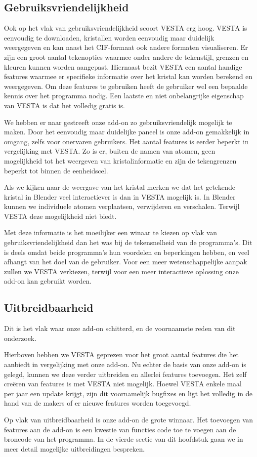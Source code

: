 \subsection{Gebruiksvriendelijkheid}	 
Ook op het vlak van gebruiksvriendelijkheid scoort VESTA erg hoog. VESTA is eenvoudig te downloaden, kristallen worden eenvoudig maar duidelijk weergegeven en kan naast het CIF-formaat ook andere formaten visualiseren. Er zijn een groot aantal tekenopties waarmee onder andere de tekenstijl, grenzen en kleuren kunnen worden aangepast. Hiernaast bezit VESTA een aantal handige features waarmee er specifieke informatie over het kristal kan worden berekend en weergegeven. Om deze features te gebruiken heeft de gebruiker wel een bepaalde kennis over het programma nodig. Een laatste en niet  onbelangrijke eigenschap van VESTA is dat het volledig gratis is.
\par
We hebben er naar gestreeft onze add-on zo gebruiksvriendelijk mogelijk te maken. Door het eenvoudig maar duidelijke paneel is onze add-on gemakkelijk in omgang, zelfs voor onervaren gebruikers. Het aantal features is eerder beperkt in vergelijking met VESTA. Zo is er, buiten de namen van atomen, geen mogelijkheid tot het weergeven van kristalinformatie en zijn de tekengrenzen beperkt tot binnen de eenheidscel. 
\par
Als we kijken naar de weergave van het kristal merken we dat het getekende kristal in Blender veel interactiever is dan in VESTA mogelijk is. In Blender kunnen we individuele atomen verplaatsen, verwijderen en verschalen. Terwijl VESTA deze mogelijkheid niet biedt.
\par
Met deze informatie is het moeilijker een winaar te kiezen op vlak van gebruiksvriendelijkheid dan het was bij de tekensnelheid van de programma's. Dit is deels omdat beide programma's hun voordelen en beperkingen hebben, en veel afhangt van het doel van de gebruiker. Voor een meer wetenschappelijke aanpak zullen we VESTA verkiezen, terwijl voor een meer interactieve oplossing onze add-on kan gebruikt worden.

\subsection{Uitbreidbaarheid}
Dit is het vlak waar onze add-on schitterd, en de voornaamste reden van dit onderzoek. 
\par
Hierboven hebben we VESTA geprezen voor het groot aantal features die het aanbiedt in vergelijking met onze add-on. Nu echter de basis van onze add-on is gelegd, kunnen we deze verder uitbreiden en allerlei features toevoegen. Het zelf creëren van features is met VESTA niet mogelijk. Hoewel VESTA enkele maal per jaar een update krijgt, zijn dit voornamelijk bugfixes en ligt het volledig in de hand van de makers of er nieuwe features worden toegevoegd.   
\par
Op vlak van uitbreidbaarheid is onze add-on de grote winnaar. Het toevoegen van features aan de add-on is een kwestie van functies code toe te voegen aan de broncode van het programma. In de vierde sectie van dit hoofdstuk gaan we in meer detail mogelijke uitbreidingen bespreken. 


